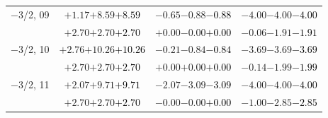 \documentclass[compress]{beamer}
\begin{document}
\begin{frame}
\begin{tabular}{r | c | c | c}
$-$3/2, 09 & $+1.17$\hspace{0.1 cm}$+8.59$\hspace{0.1 cm}\textcolor{black}{$+8.59$} & $-0.65$\hspace{0.1 cm}$-0.88$\hspace{0.1 cm}\textcolor{black}{$-0.88$} & $-4.00$\hspace{0.1 cm}$-4.00$\hspace{0.1 cm}\textcolor{black}{$-4.00$} \\
           & $+2.70$\hspace{0.1 cm}$+2.70$\hspace{0.1 cm}\textcolor{black}{$+2.70$} & $+0.00$\hspace{0.1 cm}$-0.00$\hspace{0.1 cm}\textcolor{black}{$+0.00$} & $-0.06$\hspace{0.1 cm}$-1.91$\hspace{0.1 cm}\textcolor{black}{$-1.91$} \\
$-$3/2, 10 & $+2.76$\hspace{0.1 cm}$+10.26$\hspace{0.1 cm}\textcolor{black}{$+10.26$} & $-0.21$\hspace{0.1 cm}$-0.84$\hspace{0.1 cm}\textcolor{black}{$-0.84$} & $-3.69$\hspace{0.1 cm}$-3.69$\hspace{0.1 cm}\textcolor{black}{$-3.69$} \\
           & $+2.70$\hspace{0.1 cm}$+2.70$\hspace{0.1 cm}\textcolor{black}{$+2.70$} & $+0.00$\hspace{0.1 cm}$+0.00$\hspace{0.1 cm}\textcolor{black}{$+0.00$} & $-0.14$\hspace{0.1 cm}$-1.99$\hspace{0.1 cm}\textcolor{black}{$-1.99$} \\
$-$3/2, 11 & $+2.07$\hspace{0.1 cm}$+9.71$\hspace{0.1 cm}\textcolor{black}{$+9.71$} & $-2.07$\hspace{0.1 cm}$-3.09$\hspace{0.1 cm}\textcolor{black}{$-3.09$} & $-4.00$\hspace{0.1 cm}$-4.00$\hspace{0.1 cm}\textcolor{black}{$-4.00$} \\
           & $+2.70$\hspace{0.1 cm}$+2.70$\hspace{0.1 cm}\textcolor{black}{$+2.70$} & $-0.00$\hspace{0.1 cm}$-0.00$\hspace{0.1 cm}\textcolor{black}{$+0.00$} & $-1.00$\hspace{0.1 cm}$-2.85$\hspace{0.1 cm}\textcolor{black}{$-2.85$} \\

\end{tabular}
\end{frame}
\end{document}
